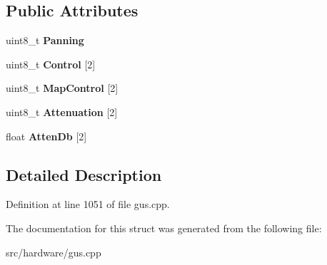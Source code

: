 \subsection*{Public Attributes}
\begin{DoxyCompactItemize}
\item 
\hypertarget{structgus__ICS2101_1_1mixcontrol_a51061e6484c9e123414be0af811b714f}{uint8\-\_\-t {\bfseries Panning}}\label{structgus__ICS2101_1_1mixcontrol_a51061e6484c9e123414be0af811b714f}

\item 
\hypertarget{structgus__ICS2101_1_1mixcontrol_abc998b7038d01a551dbc659027d54f66}{uint8\-\_\-t {\bfseries Control} \mbox{[}2\mbox{]}}\label{structgus__ICS2101_1_1mixcontrol_abc998b7038d01a551dbc659027d54f66}

\item 
\hypertarget{structgus__ICS2101_1_1mixcontrol_a916268f834849e724a87c1f6510bb964}{uint8\-\_\-t {\bfseries Map\-Control} \mbox{[}2\mbox{]}}\label{structgus__ICS2101_1_1mixcontrol_a916268f834849e724a87c1f6510bb964}

\item 
\hypertarget{structgus__ICS2101_1_1mixcontrol_afb5439928a40cd9679b7128298f92702}{uint8\-\_\-t {\bfseries Attenuation} \mbox{[}2\mbox{]}}\label{structgus__ICS2101_1_1mixcontrol_afb5439928a40cd9679b7128298f92702}

\item 
\hypertarget{structgus__ICS2101_1_1mixcontrol_afc8504acb2e1fb3afcc045e255023605}{float {\bfseries Atten\-Db} \mbox{[}2\mbox{]}}\label{structgus__ICS2101_1_1mixcontrol_afc8504acb2e1fb3afcc045e255023605}

\end{DoxyCompactItemize}


\subsection{Detailed Description}


Definition at line 1051 of file gus.\-cpp.



The documentation for this struct was generated from the following file\-:\begin{DoxyCompactItemize}
\item 
src/hardware/gus.\-cpp\end{DoxyCompactItemize}
